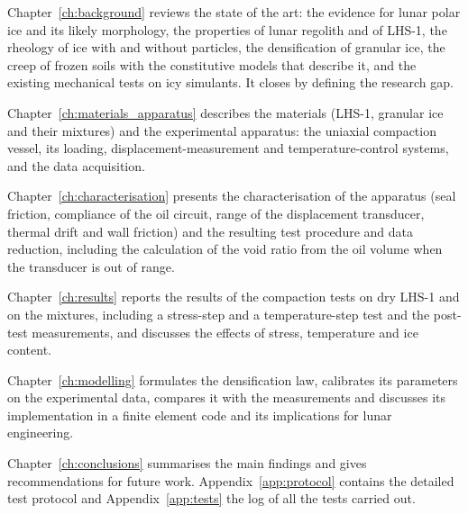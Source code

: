 Chapter~\ref{ch:background} reviews the state of the art: the evidence for lunar polar ice and its likely morphology, the properties of lunar regolith and of LHS-1, the rheology of ice with and without particles, the densification of granular ice, the creep of frozen soils with the constitutive models that describe it, and the existing mechanical tests on icy simulants. It closes by defining the research gap.

Chapter~\ref{ch:materials_apparatus} describes the materials (LHS-1, granular ice and their mixtures) and the experimental apparatus: the uniaxial compaction vessel, its loading, displacement-measurement and temperature-control systems, and the data acquisition.

Chapter~\ref{ch:characterisation} presents the characterisation of the apparatus (seal friction, compliance of the oil circuit, range of the displacement transducer, thermal drift and wall friction) and the resulting test procedure and data reduction, including the calculation of the void ratio from the oil volume when the transducer is out of range.

Chapter~\ref{ch:results} reports the results of the compaction tests on dry LHS-1 and on the mixtures, including a stress-step and a temperature-step test and the post-test measurements, and discusses the effects of stress, temperature and ice content.

Chapter~\ref{ch:modelling} formulates the densification law, calibrates its parameters on the experimental data, compares it with the measurements and discusses its implementation in a finite element code and its implications for lunar engineering.

Chapter~\ref{ch:conclusions} summarises the main findings and gives recommendations for future work. Appendix~\ref{app:protocol} contains the detailed test protocol and Appendix~\ref{app:tests} the log of all the tests carried out.